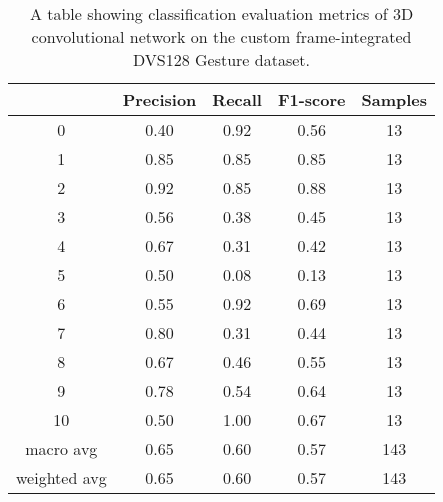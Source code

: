 \begin{table}[htb]
    \centering
    \begin{tabular}{|| c | c | c | c | c ||}
        \hline
             & Precision & Recall & F1-score & Samples \\
        \hline \hline
        0            & 0.40 & 0.92 & 0.56 & 13  \\
        \hline
        1            & 0.85 & 0.85 & 0.85 & 13  \\
        \hline
        2            & 0.92 & 0.85 & 0.88 & 13  \\
        \hline
        3            & 0.56 & 0.38 & 0.45 & 13  \\
        \hline
        4            & 0.67 & 0.31 & 0.42 & 13  \\
        \hline
        5            & 0.50 & 0.08 & 0.13 & 13  \\
        \hline
        6            & 0.55 & 0.92 & 0.69 & 13  \\
        \hline
        7            & 0.80 & 0.31 & 0.44 & 13  \\
        \hline
        8            & 0.67 & 0.46 & 0.55 & 13  \\
        \hline
        9            & 0.78 & 0.54 & 0.64 & 13  \\
        \hline
        10           & 0.50 & 1.00 & 0.67 & 13  \\
        \hline
        macro avg    & 0.65 & 0.60 & 0.57 & 143 \\
        \hline
        weighted avg & 0.65 & 0.60 & 0.57 & 143 \\
        \hline
    \end{tabular}
    \caption{A table showing classification evaluation metrics of 3D convolutional network on the custom frame-integrated DVS128 Gesture dataset.}
    \label{tab:conv3d_dvs128_custom_frame_evaluation_metrics}
\end{table}

